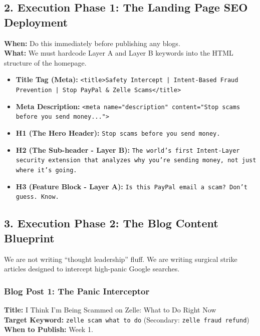 \documentclass[11pt, letterpaper]{article}
\begin{document}
\subsection*{2. Execution Phase 1: The Landing Page SEO Deployment}

\textbf{When:} Do this immediately before publishing any blogs.\\
\textbf{What:} We must hardcode Layer A and Layer B keywords into the HTML structure of the homepage.

\begin{itemize}
    \item \textbf{Title Tag (Meta):} \texttt{<title>Safety Intercept | Intent-Based Fraud Prevention | Stop PayPal \& Zelle Scams</title>}
    \item \textbf{Meta Description:} \texttt{<meta name="description" content="Stop scams before you send money...">}
    \item \textbf{H1 (The Hero Header):} \texttt{Stop scams before you send money.}
    \item \textbf{H2 (The Sub-header - Layer B):} \texttt{The world's first Intent-Layer security extension that analyzes why you're sending money, not just where it's going.}
    \item \textbf{H3 (Feature Block - Layer A):} \texttt{Is this PayPal email a scam? Don't guess. Know.}
\end{itemize}

\subsection*{3. Execution Phase 2: The Blog Content Blueprint}

We are not writing ``thought leadership'' fluff. We are writing surgical strike articles designed to intercept high-panic Google searches.

\subsubsection*{Blog Post 1: The Panic Interceptor}
\textbf{Title:} I Think I'm Being Scammed on Zelle: What to Do Right Now\\
\textbf{Target Keyword:} \texttt{zelle scam what to do} (Secondary: \texttt{zelle fraud refund})\\
\textbf{When to Publish:} Week 1.
\end{document}
